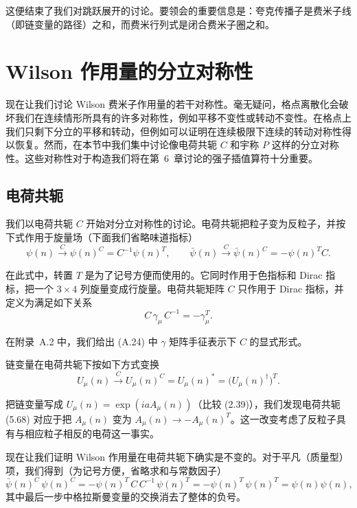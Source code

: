 这便结束了我们对跳跃展开的讨论。要领会的重要信息是：夸克传播子是费米子线（即链变量的路径）之和，而费米行列式是闭合费米子圈之和。

\section{Wilson 作用量的分立对称性}

现在让我们讨论 Wilson 费米子作用量的若干对称性。毫无疑问，格点离散化会破坏我们在连续情形所具有的许多对称性，例如平移不变性或转动不变性。在格点上我们只剩下分立的平移和转动，但例如可以证明在连续极限下连续的转动对称性得以恢复。然而，在本节中我们集中讨论像电荷共轭 $C$ 和宇称 $P$ 这样的分立对称性。这些对称性对于构造我们将在第~6~章讨论的强子插值算符十分重要。

\subsection{电荷共轭}

我们以电荷共轭 $C$ 开始对分立对称性的讨论。电荷共轭把粒子变为反粒子，并按下式作用于旋量场（下面我们省略味道指标）
\begin{equation}
  \psi(n) \xrightarrow{\;C\;} \psi(n)^C = C^{-1}\psi(n)^T, \qquad
  \bar{\psi}(n) \xrightarrow{\;C\;} \bar{\psi}(n)^C = -\psi(n)^T C .
\end{equation}

在此式中，转置 $T$ 是为了记号方便而使用的。它同时作用于色指标和 Dirac 指标，把一个 $3 \times 4$ 列旋量变成行旋量。电荷共轭矩阵 $C$ 只作用于 Dirac 指标，并定义为满足如下关系
\begin{equation}
  C\,\gamma_\mu\,C^{-1} = -\gamma_\mu^T .
\end{equation}

在附录~A.2 中，我们给出 (A.24) 中 $\gamma$ 矩阵手征表示下 $C$ 的显式形式。

链变量在电荷共轭下按如下方式变换
\begin{equation}
  U_\mu(n) \xrightarrow{\;C\;} U_\mu(n)^C = U_\mu(n)^* = \big(U_\mu(n)^\dagger\big)^T .
\end{equation}

把链变量写成 $U_\mu(n) = \exp(iaA_\mu(n))$（比较 (2.39)），我们发现电荷共轭 (5.68) 对应于把 $A_\mu(n)$ 变为 $A_\mu(n) \to -A_\mu(n)^T$。这一改变考虑了反粒子具有与相应粒子相反的电荷这一事实。

现在让我们证明 Wilson 作用量在电荷共轭下确实是不变的。对于平凡（质量型）项，我们得到（为记号方便，省略求和与常数因子）
\begin{equation}
  \bar{\psi}(n)^C\,\psi(n)^C = -\psi(n)^T\,C\,C^{-1}\,\psi(n)^T
    = -\psi(n)^T\,\psi(n)^T = \psi(n)\psi(n) ,
\end{equation}
其中最后一步中格拉斯曼变量的交换消去了整体的负号。


